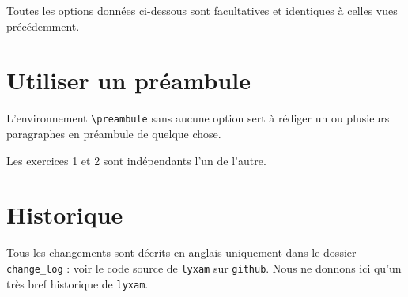 \documentclass[12pt,a4paper]{scrartcl}
\makeatletter
\theoremstyle{definition}
\newcommand\resetallcnt{
    	\setcounter{lyxam@counter@topic}{0}
    	\setcounter{lyxam@counter@exercise}{0}
    	\setcounter{lyxam@counter@problem}{0}
    	\setcounter{lyxam@counter@bonus}{0}
    	\setcounter{lyxam@counter@subpart}{0}
    }
\newcommand\IDmacro{\@ifstar{\@IDmacroStar}{\@IDmacroNoStar}}
\newcommand\@IDmacroNoStar[3]{%
        \texttt{%
        	\textbackslash#1%
        	\IfStrEq{#2}{0}{}{%
        		\,\,[#2 Option%
    			\IfStrEq{#2}{1}{}{s}]%
    		}%
    	    \IfStrEq{#3}{}{}{%
        		\,\,(#3 Argument%
    			\IfStrEq{#3}{1}{}{s})%
    		}
       	}
        \immediate\write\tempfile{macro@#1@#2@#3}%
    }
\newcommand\@IDmacroStar[2]{%
        \@IDmacroNoStar{#1}{0}{#2}%
    }
\makeatother
\begin{document}
Toutes les options données ci-dessous sont facultatives et identiques à celles vues précédemment.

\bigskip


\IDmacro{topic}{6}{}

\exosoptions{}



\section{Utiliser un préambule}

L'environnement \verb+\preambule+ sans aucune option sert à rédiger un ou plusieurs paragraphes en préambule de quelque chose.

\resetallcnt{}

\resetallcnt{}

\begin{tcblisting}{}
\begin{preambule}
	Les exercices 1 et 2 sont indépendants l'un de l'autre.
\end{preambule}

\exercise
\exercise
\end{tcblisting}





\section{Historique}

Tous les changements sont décrits en anglais uniquement dans le dossier \verb+change_log+ : voir le code source de \verb+lyxam+ sur \verb+github+. Nous ne donnons ici qu'un très bref historique de \verb+lyxam+.
\end{document}
